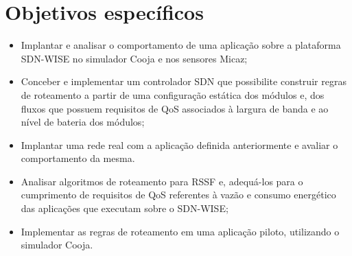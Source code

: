 \section{Objetivos específicos}
\label{s_introducao_OE}
\begin{itemize}
  \item Implantar e analisar o comportamento de uma aplicação sobre a plataforma \ac{SDN-WISE} no simulador Cooja e nos sensores Micaz;
  \item Conceber e implementar um controlador \ac{SDN} que possibilite construir regras de roteamento a partir de uma configuração estática dos módulos e, dos fluxos que possuem requisitos de \ac{QoS} associados à largura de banda e ao nível de bateria dos módulos;
  \item Implantar uma rede real com a aplicação definida anteriormente e avaliar o comportamento da mesma.
  \item Analisar algoritmos de roteamento para \ac{RSSF} e, adequá-los para o cumprimento de requisitos de \ac{QoS} referentes à vazão e consumo energético das aplicações que executam sobre o \ac{SDN-WISE};
  \item Implementar as regras de roteamento em uma aplicação piloto, utilizando o simulador Cooja.
\end{itemize}
